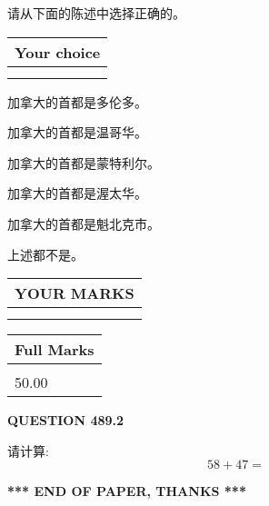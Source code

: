 \documentclass{ctexart}
\begin{document}
  
请从下面的陈述中选择正确的。
  
  
\noindent\hspace{3.0in} \begin{tabular}{|l|}
\hline
Your choice \\
\hline
 \\ 
 \\ 
\hline
\end{tabular}
  
  
 
 
加拿大的首都是多伦多。
 
 
加拿大的首都是温哥华。
 
 
加拿大的首都是蒙特利尔。
 
 
加拿大的首都是渥太华。
 
 
加拿大的首都是魁北克市。
 
 
 上述都不是。
 
 
  
\vspace{0.2in}
  
\noindent\begin{tabular}{|l|}
\hline
 YOUR MARKS  \\
\hline
 \\ 
 \\ 
\hline
\end{tabular}
\hspace{0.05in} \begin{tabular}{|l|}
\hline
 Full Marks  \\
\hline
 \\ 
50.00 \\
\hline
\end{tabular}
{\textbf{\Large{QUESTION
489.2 
}}}
  
  
 
请计算:
\begin{equation}
58 +  %
47 = \nonumber
\end{equation}
 

 

 
   
   
 \vspace{0.2in}
 
   
   
   
   
\vspace{1.0in} 
{\textbf{\large{ *** END OF PAPER, THANKS *** }}} 
   
\end{document}
